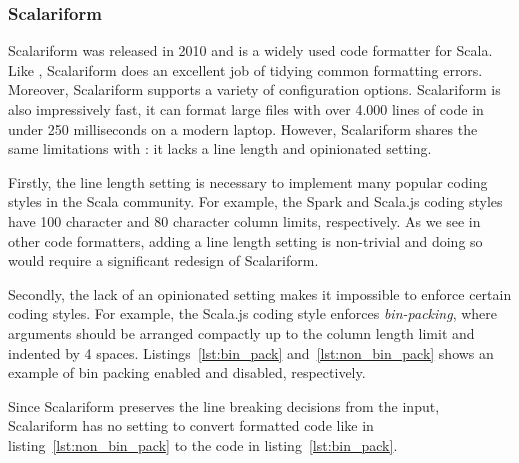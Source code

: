 \subsubsection{Scalariform}
Scalariform\autocite{russell_scalariform_2010} was released in 2010 and is a widely used code formatter for Scala.
Like \gofmt{}, Scalariform does an excellent job of tidying common formatting errors.
Moreover, Scalariform supports a variety of configuration options.
Scalariform is also impressively fast, it can format large files with over 4.000 lines of code in under 250 milliseconds on a modern laptop.
However, Scalariform shares the same limitations with \gofmt{}: it lacks a line length and opinionated setting.

Firstly, the line length setting is necessary to implement many popular coding styles in the Scala community.
For example, the Spark\autocite{xin_spark_2015} and Scala.js\autocite{doeraene_scala.js_2015} coding styles have 100 character and 80 character column limits, respectively.
As we see in other code formatters, adding a line length setting is non-trivial and doing so would require a significant redesign of Scalariform.

Secondly, the lack of an opinionated setting makes it impossible to enforce certain coding styles.
For example, the Scala.js coding style enforces \emph{bin-packing}, where arguments should be arranged compactly up to the column length limit and indented by 4 spaces.
Listings~\ref{lst:bin_pack} and~\ref{lst:non_bin_pack} shows an example of bin packing enabled and disabled, respectively.

\begin{minipage}{.45\textwidth}
  
\end{minipage}
\hfil
\begin{minipage}{.45\textwidth}
  
\end{minipage}

Since Scalariform preserves the line breaking decisions from the input,
Scalariform has no setting to convert formatted code like in listing~\ref{lst:non_bin_pack} to the code in listing~\ref{lst:bin_pack}.


